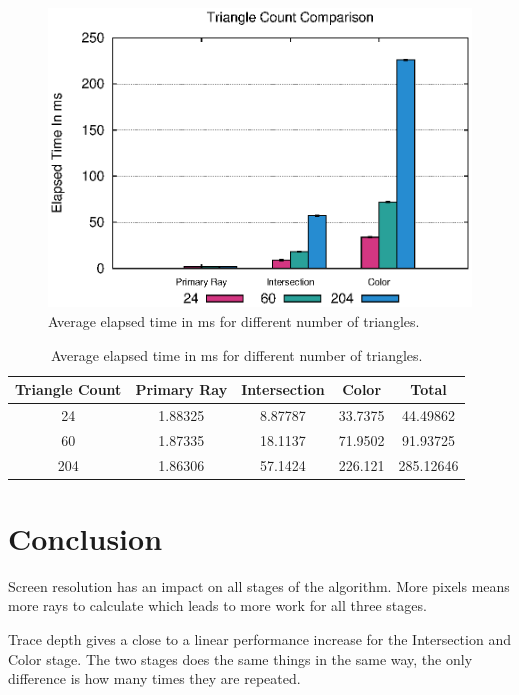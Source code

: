 \documentclass{article}
\begin{document}
\begin{figure}[h!tbp]
    \centering
    \includegraphics[width=1.0\columnwidth]{Figures/trianglecount.eps}
    \caption{Average elapsed time in ms for different number of triangles. \label{fig:trianglecount}}
\end{figure}

\begin{table}[h!btp]
\centering
\begin{tabular}{c|c|c|c|c}
    Triangle Count & Primary Ray & Intersection & Color & Total \\ [2pt]
\hline
    24  & 1.88325 & 8.87787  & 33.7375 & 44.49862 \\
\hline
    60  & 1.87335 & 18.1137 & 71.9502 & 91.93725 \\
\hline
    204 & 1.86306 & 57.1424 & 226.121 & 285.12646 \\
\hline
\end{tabular}
\caption{Average elapsed time in ms for different number of triangles. \label{tab:ResultsTriangleCount}}
\end{table}



\section{Conclusion}
\label{sec:Conclusion}

Screen resolution has an impact on all stages of the algorithm. More pixels means more rays to calculate which leads to
more work for all three stages.

Trace depth gives a close to a linear performance increase for the Intersection and Color stage. The two stages does the same things in the same way, the
only difference is how many times they are repeated.
\end{document}
